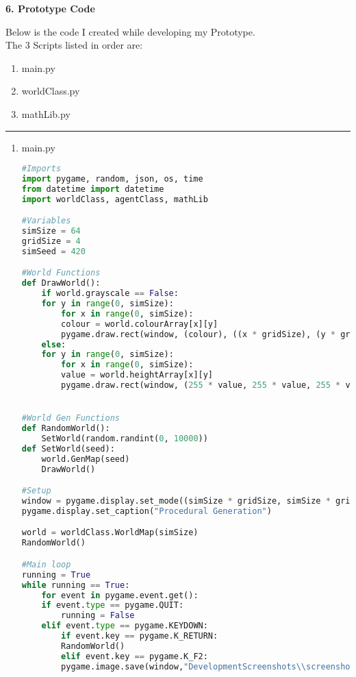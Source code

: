 \begin{flushleft}
    \huge
    \textbf{6. Prototype Code}
    \vspace{0.1cm}

    \large
    Below is the code I created while developing my Prototype. \\
    The 3 Scripts listed in order are: 
    \normalsize
    \begin{enumerate}
        \item main.py
        \item worldClass.py
        \item mathLib.py
    \end{enumerate}

    \noindent\rule{\textwidth}{0.4pt}

    \normalsize
    \begin{enumerate}
        \item main.py
        \begin{lstlisting}[language=Python]
#Imports
import pygame, random, json, os, time
from datetime import datetime
import worldClass, agentClass, mathLib

#Variables
simSize = 64
gridSize = 4
simSeed = 420

#World Functions
def DrawWorld():
    if world.grayscale == False:
    for y in range(0, simSize):
        for x in range(0, simSize):
        colour = world.colourArray[x][y]
        pygame.draw.rect(window, (colour), ((x * gridSize), (y * gridSize), gridSize, gridSize))
    else:
    for y in range(0, simSize):
        for x in range(0, simSize):
        value = world.heightArray[x][y]
        pygame.draw.rect(window, (255 * value, 255 * value, 255 * value), ((x * gridSize), (y * gridSize), gridSize, gridSize))


#World Gen Functions
def RandomWorld():
    SetWorld(random.randint(0, 10000))
def SetWorld(seed):
    world.GenMap(seed)
    DrawWorld()

#Setup
window = pygame.display.set_mode((simSize * gridSize, simSize * gridSize))
pygame.display.set_caption("Procedural Generation")

world = worldClass.WorldMap(simSize)
RandomWorld()

#Main loop
running = True
while running == True:
    for event in pygame.event.get():
    if event.type == pygame.QUIT:
        running = False
    elif event.type == pygame.KEYDOWN:
        if event.key == pygame.K_RETURN:
        RandomWorld()
        elif event.key == pygame.K_F2:
        pygame.image.save(window,"DevelopmentScreenshots\\screenshot{}.png".format(len(next(os.walk("DevelopmentScreenshots"))[2])))


\end{lstlisting}
\end{enumerate}
\end{flushleft}
